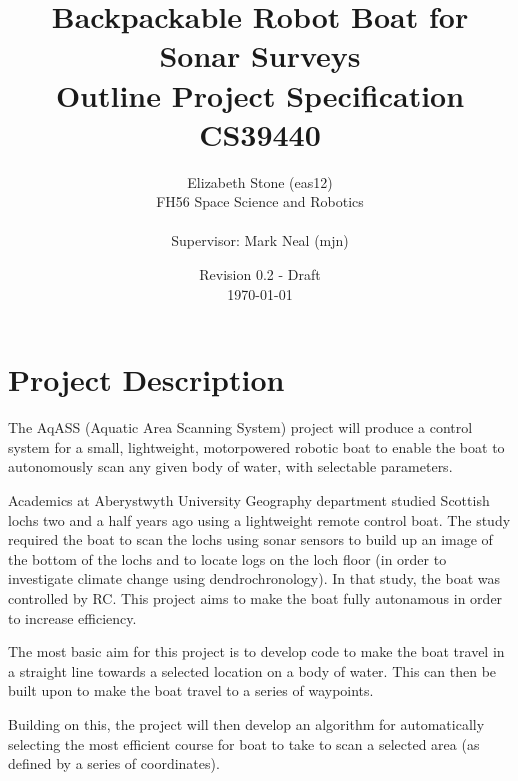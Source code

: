 \documentclass[titlepage 12pt]{article}
\title{Backpackable Robot Boat for Sonar Surveys\\ Outline Project Specification\\ CS39440}
\author{ Elizabeth Stone (eas12)\\FH56 Space Science and Robotics\\ \\Supervisor: Mark Neal (mjn) }
\date{Revision 0.2 - Draft\\ \today\vspace{-3em} }
\begin{document}
{
\selectfont


\begin{titlepage}
	\clearpage\maketitle
\thispagestyle{empty}
	 \vspace{250pt}

	
\end{titlepage}





\section{Project Description}

The AqASS (Aquatic Area Scanning System) project will produce a control system for a small, lightweight, motorpowered robotic boat to enable the boat to autonomously scan any given body of water, with selectable parameters. 

Academics at Aberystwyth University Geography department studied Scottish lochs two and a half years ago using a  lightweight remote control boat. The study required the boat to scan the lochs using sonar sensors to build up an image of the bottom of the lochs and to locate logs on the loch floor (in order to investigate climate change using dendrochronology)\cite{rbates14}. In that study, the boat was controlled by RC. This project aims to make the boat fully autonamous in order to increase efficiency.

The most basic aim for this project is to develop code to make the boat travel in a straight line towards a selected location on a body of water. This can then be built upon to make the boat travel to a series of waypoints.

Building on this, the project will then develop an algorithm for automatically selecting the most efficient course for boat to take to scan a selected area (as defined by a series of coordinates). 

}
\end{document}
